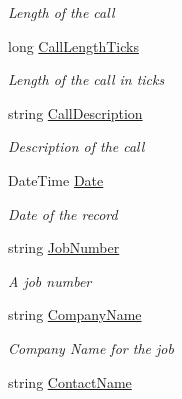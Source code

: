 \begin{DoxyCompactItemize}
\begin{DoxyCompactList}\small\item\em Length of the call \end{DoxyCompactList}\item 
long \hyperlink{class_field_service_1_1_data_1_1_assignment_history_a8b0716160be52900e6a30d7dac22f881}{Call\+Length\+Ticks}
\begin{DoxyCompactList}\small\item\em Length of the call in ticks \end{DoxyCompactList}\item 
string \hyperlink{class_field_service_1_1_data_1_1_assignment_history_acfc6023f6c278717e003965eec5e6796}{Call\+Description}
\begin{DoxyCompactList}\small\item\em Description of the call \end{DoxyCompactList}\item 
Date\+Time \hyperlink{class_field_service_1_1_data_1_1_assignment_history_a3cb0d9bf3982881b97c5a5e9a7893e31}{Date}
\begin{DoxyCompactList}\small\item\em Date of the record \end{DoxyCompactList}\item 
string \hyperlink{class_field_service_1_1_data_1_1_assignment_history_aab7d91362df0bd7ba10cc38e4f1453f9}{Job\+Number}
\begin{DoxyCompactList}\small\item\em A job number \end{DoxyCompactList}\item 
string \hyperlink{class_field_service_1_1_data_1_1_assignment_history_ad75d099fa3d245cdca1e777836813883}{Company\+Name}
\begin{DoxyCompactList}\small\item\em Company Name for the job \end{DoxyCompactList}\item 
string \hyperlink{class_field_service_1_1_data_1_1_assignment_history_a192e1512d2555e0b51f83a3406f834d1}{Contact\+Name}

\end{DoxyCompactItemize}

